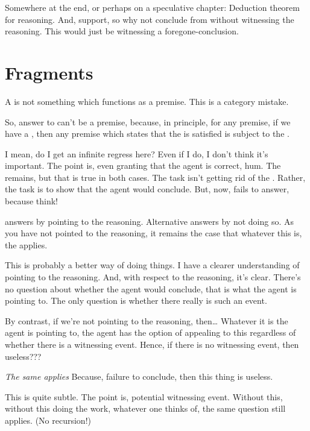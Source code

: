 \begin{note}
  Somewhere at the end, or perhaps on a speculative chapter:
  Deduction theorem for reasoning.
  And, support, so why not conclude from without witnessing the reasoning.
  This would just be witnessing a foregone-conclusion.
\end{note}

\section{Fragments}

\begin{note}
  A \fc{} is not something which functions as a premise.
  This is a category mistake.

  So, answer to \qzS{} can't be a premise, because, in principle, for any premise, if we have a \requ{}, then any premise which states that the \requ{} is satisfied is subject to the \requ{}.

  I mean, do I get an infinite regress here?
  Even if I do, I don't think it's important.
  The point is, even granting that the agent is correct, hum.
  The \requ{} remains, but that is true in both cases.
  The task isn't getting rid of the \requ{}.
  Rather, the task is to show that the agent would conclude.
  But, now, fails to answer, because think!

  \fc{} answers by pointing to the reasoning.
  Alternative answers by not doing so.
  As you have not pointed to the reasoning, it remains the case that whatever this is, the \requ{} applies.

  This is probably a better way of doing things.
  I have a clearer understanding of pointing to the reasoning.
  And, with respect to the reasoning, it's clear.
  There's no question about whether the agent would conclude, that is what the agent is pointing to.
  The only question is whether there really is such an event.

  By contrast, if we're not pointing to the reasoning, then\dots
  Whatever it is the agent is pointing to, the agent has the option of appealing to this regardless of whether there is a witnessing event.
  Hence, if there is no witnessing event, then useless???

  \emph{The same \requ{} applies}
  Because, failure to conclude, then this thing is useless.

  This is quite subtle.
  The point is, potential witnessing event.
  Without this, without this doing the work, whatever one thinks of, the same question still applies.
  (No recursion!)


\end{note}
